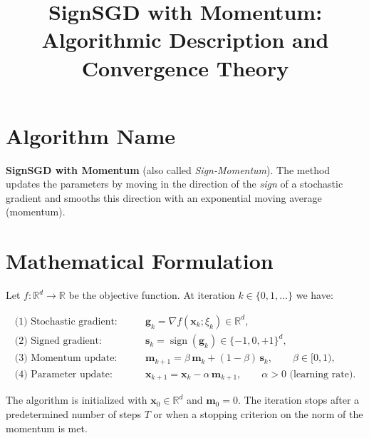 \documentclass{article}
\newcommand{\sgn}{\operatorname{sign}}
\begin{document}
\title{SignSGD with Momentum:\\Algorithmic Description and Convergence Theory}
\author{}
\date{}
\maketitle

\section*{Algorithm Name}
\textbf{SignSGD with Momentum} (also called \emph{Sign-Momentum}).  
The method updates the parameters by moving in the direction of the \emph{sign} of a stochastic gradient and smooths this direction with an exponential moving average (momentum).

\section*{Mathematical Formulation}
Let $f:\mathbb{R}^{d}\rightarrow\mathbb{R}$ be the objective function.  
At iteration $k\in\{0,1,\dots\}$ we have:

\begin{align}
\text{(1) Stochastic gradient:}&\qquad 
\mathbf{g}_{k}= \nabla f(\mathbf{x}_{k};\xi_{k})\in\mathbb{R}^{d},
\label{eq:grad}\\[4pt]
\text{(2) Signed gradient:}&\qquad 
\mathbf{s}_{k}= \sgn(\mathbf{g}_{k})\in\{-1,0,+1\}^{d},
\label{eq:sign}\\[4pt]
\text{(3) Momentum update:}&\qquad 
\mathbf{m}_{k+1}= \beta\,\mathbf{m}_{k}+(1-\beta)\,\mathbf{s}_{k},
\qquad \beta\in[0,1), \label{eq:momentum}\\[4pt]
\text{(4) Parameter update:}&\qquad 
\mathbf{x}_{k+1}= \mathbf{x}_{k}-\alpha\,\mathbf{m}_{k+1},
\qquad \alpha>0 \text{ (learning rate)}. \label{eq:update}
\end{align}

The algorithm is initialized with $\mathbf{x}_{0}\in\mathbb{R}^{d}$ and $\mathbf{m}_{0}=0$.
The iteration stops after a predetermined number of steps $T$ or when a stopping criterion on the norm of the momentum is met.

\end{document}
